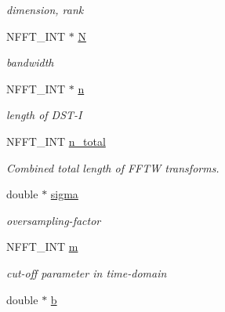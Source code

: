 \begin{DoxyCompactItemize}
\begin{DoxyCompactList}\small\item\em dimension, rank \end{DoxyCompactList}\item 
\hypertarget{structnfst__plan_aed734c0b3626328a80ad9919390659eb}{N\-F\-F\-T\-\_\-\-I\-N\-T $\ast$ \hyperlink{structnfst__plan_aed734c0b3626328a80ad9919390659eb}{N}}\label{structnfst__plan_aed734c0b3626328a80ad9919390659eb}

\begin{DoxyCompactList}\small\item\em bandwidth \end{DoxyCompactList}\item 
\hypertarget{structnfst__plan_afb3907a61b79180a1d5d2fb350544a31}{N\-F\-F\-T\-\_\-\-I\-N\-T $\ast$ \hyperlink{structnfst__plan_afb3907a61b79180a1d5d2fb350544a31}{n}}\label{structnfst__plan_afb3907a61b79180a1d5d2fb350544a31}

\begin{DoxyCompactList}\small\item\em length of D\-S\-T-\/\-I \end{DoxyCompactList}\item 
N\-F\-F\-T\-\_\-\-I\-N\-T \hyperlink{structnfst__plan_a48ac1a7152dfb32072bf59034422a4f4}{n\-\_\-total}
\begin{DoxyCompactList}\small\item\em Combined total length of F\-F\-T\-W transforms. \end{DoxyCompactList}\item 
\hypertarget{structnfst__plan_a7a8028a0e7348e5fa7717eebf07b76d1}{double $\ast$ \hyperlink{structnfst__plan_a7a8028a0e7348e5fa7717eebf07b76d1}{sigma}}\label{structnfst__plan_a7a8028a0e7348e5fa7717eebf07b76d1}

\begin{DoxyCompactList}\small\item\em oversampling-\/factor \end{DoxyCompactList}\item 
\hypertarget{structnfst__plan_a5e23fbf74b3499acc9fd4fb067bd086d}{N\-F\-F\-T\-\_\-\-I\-N\-T \hyperlink{structnfst__plan_a5e23fbf74b3499acc9fd4fb067bd086d}{m}}\label{structnfst__plan_a5e23fbf74b3499acc9fd4fb067bd086d}

\begin{DoxyCompactList}\small\item\em cut-\/off parameter in time-\/domain \end{DoxyCompactList}\item 
\hypertarget{structnfst__plan_a49927bec2aa96ab8596740011fabb914}{double $\ast$ \hyperlink{structnfst__plan_a49927bec2aa96ab8596740011fabb914}{b}}\label{structnfst__plan_a49927bec2aa96ab8596740011fabb914}


\end{DoxyCompactItemize}
